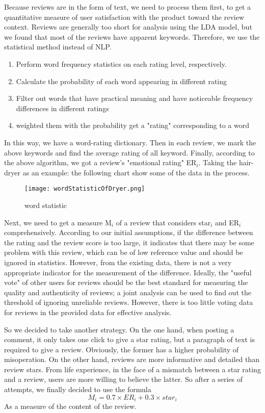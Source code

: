 \documentclass{mcmthesis}
\begin{document}
Because reviews are in the form of text, we need to process them first, to get a quantitative measure of user satisfaction with the product toward the review context. Reviews are generally too short for analysis using the LDA model, but we found that most of the reviews have apparent keywords. Therefore, we use the statistical method instead of NLP.

\begin{enumerate}
\item Perform word frequency statistics on each rating level, respectively.
\item Calculate the probability of each word appearing in different rating
\item Filter out words that have practical meaning and have noticeable frequency differences in different ratings
\item weighted them with the probability get a "rating" corresponding to a word
\end{enumerate}

In this way, we have a word-rating dictionary. Then in each review, we mark the above keywords and find the average rating of all keyword. Finally, according to the above algorithm, we got a review's "emotional rating" ER$_{i}$.
Taking the hair-dryer as an example: the following chart show some of the data in the process.

\begin{figure}[h]
  \small
  \centering
  \texttt{[image: wordStatisticOfDryer.png]}
  \caption{word statistic} \label{fig:aa}
\end{figure}

Next, we need to get a measure M$_{i}$ of a review that considers star$_{i}$ and ER$_{i}$ comprehensively.
According to our initial assumptions, if the difference between the rating and the review score is too large, it indicates that there may be some problem with this review, which can be of low reference value and should be ignored in statistics. However, from the existing data, there is not a very appropriate indicator for the measurement of the difference. Ideally, the "useful vote" of other users for reviews should be the best standard for measuring the quality and authenticity of reviews; a joint analysis can be used to find out the threshold of ignoring unreliable reviews. However, there is too little voting data for reviews in the provided data for effective analysis. 

So we decided to take another strategy. On the one hand, when posting a comment, it only takes one click to give a star rating, but a paragraph of text is required to give a review. Obviously, the former has a higher probability of misoperation. On the other hand, reviews are more informative and detailed than review stars. From life experience, in the face of a mismatch between a star rating and a review, users are more willing to believe the latter. So after a series of attempts, we finally decided to use the formula
\[
	M_{i} = 0.7 \times ER_{i} + 0.3 \times star_{i}
\]
As a measure of the content of the review.
\end{document}
